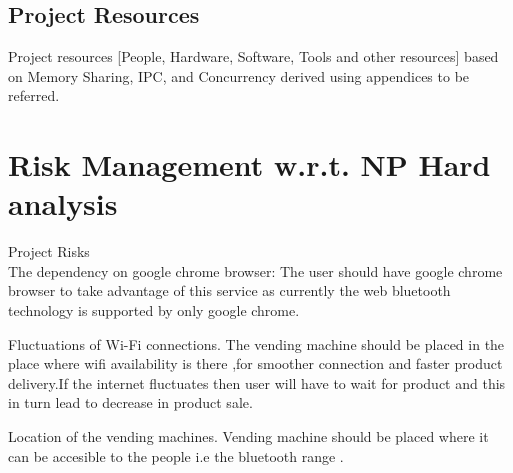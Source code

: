 \documentclass[oneside,a4paper,12pt]{report}
\begin{document}
\subsection{Project Resources}
Project resources  [People, Hardware, Software, Tools and other resources] based on Memory Sharing, IPC, and Concurrency derived using appendices to be referred. 

\section{Risk Management w.r.t. NP Hard analysis}
Project Risks \\
The dependency on google chrome browser:
The user should have google chrome browser to take advantage of this service as currently the web bluetooth technology is supported by only google chrome.

Fluctuations of Wi-Fi connections.
The vending machine should be placed in the place where wifi availability is there ,for smoother connection and faster product delivery.If the internet fluctuates then user will have to wait for product and this in turn lead to decrease in product sale.
 
Location of the vending machines.
Vending machine should be placed where it can be accesible to the people i.e the bluetooth range .

 
\end{document}
